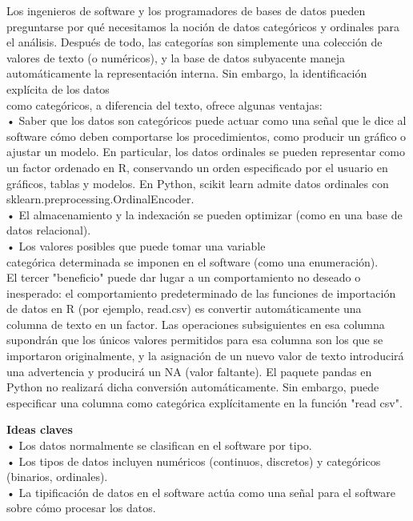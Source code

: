 \documentclass[ebook,12pt,oneside,openany]{memoir}
\begin{document}
Los ingenieros de software y los programadores de bases de datos pueden preguntarse por qué necesitamos la noción de datos categóricos y ordinales para el análisis. Después de todo, las categorías son simplemente una colección de valores de texto (o numéricos), y la base de datos subyacente maneja automáticamente la representación interna. Sin embargo, la identificación explícita de los datos\\ como categóricos, a diferencia del texto, ofrece algunas ventajas:\\
• Saber que los datos son categóricos puede actuar como una señal que le dice al software cómo
deben comportarse los procedimientos, como producir un gráfico o ajustar un modelo. En particular, los datos ordinales se pueden representar como un factor ordenado en R, conservando un orden especificado por el usuario en gráficos, tablas y modelos. En Python, scikit learn admite datos ordinales con sklearn.preprocessing.OrdinalEncoder.\\
• El almacenamiento y la indexación se pueden optimizar (como en una base de datos relacional).\\
• Los valores posibles que puede tomar una variable \\categórica determinada se imponen en el software (como una enumeración).\\
 El tercer "beneficio" puede dar lugar a un comportamiento no deseado o inesperado: el comportamiento predeterminado de las funciones de importación de datos en R (por ejemplo, read.csv) es convertir automáticamente una \\columna de texto en un factor. Las operaciones subsiguientes en esa columna supondrán que los únicos valores permitidos para esa columna son los que se importaron originalmente, y la asignación de un nuevo valor de texto introducirá una advertencia y producirá un NA (valor faltante). El paquete pandas en Python no realizará dicha conversión automáticamente. Sin embargo, puede especificar una columna como categórica explícitamente en la función {"read csv"}.

 \setlength{\parindent}{0pt}\textbf {Ideas claves}\\
• Los datos normalmente se clasifican en el software por tipo.\\
• Los tipos de datos incluyen numéricos (continuos, discretos) y categóricos (binarios, ordinales).\\
• La tipificación de datos en el software actúa como una señal para el software sobre cómo procesar los datos.\\
\end{document}
